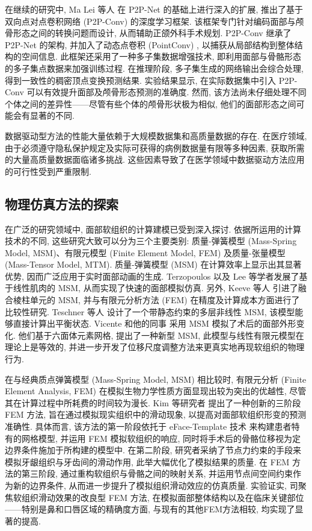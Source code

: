 在继续的研究中, Ma Lei 等人 \cite{maBidirectionalPredictionFacial2023} 在 P2P-Net \cite{yinP2PNETBidirectionalPoint2018} 的基础上进行深入的扩展, 推出了基于双向点对点卷积网络 (P2P-Conv) 的深度学习框架.
该框架专门针对编码面部与颅骨形态之间的转换问题而设计, 从而辅助正颌外科手术规划.
P2P-Conv 继承了 P2P-Net 的架构, 并加入了动态点卷积 (PointConv) , 以捕获从局部结构到整体结构的空间信息.
此框架还采用了一种多子集数据增强技术, 即利用面部与骨骼形态的多子集点数据来加强训练过程.
在推理阶段, 多子集生成的网络输出会综合处理, 得到一致性的稠密顶点变换预测结果.
实验结果显示, 在实际数据集中引入 P2P-Conv 可以有效提升面部及颅骨形态预测的准确度.
然而, 该方法尚未仔细处理不同个体之间的差异性——尽管有些个体的颅骨形状极为相似, 他们的面部形态之间可能会有显著的不同.

数据驱动型方法的性能大量依赖于大规模数据集和高质量数据的存在.
在医疗领域, 由于必须遵守隐私保护规定及实际可获得的病例数据量有限等多种因素, 获取所需的大量高质量数据面临诸多挑战.
这些因素导致了在医学领域中数据驱动方法应用的可行性受到严重限制.

\subsection{物理仿真方法的探索}

在广泛的研究领域中, 面部软组织的计算建模已受到深入探讨.
依据所运用的计算技术的不同, 这些研究大致可以分为三个主要类别: 质量-弹簧模型 (Mass-Spring Model, MSM)、有限元模型 (Finite Element Model, FEM) 及质量-张量模型 (Mass-Tensor Model, MTM).
质量-弹簧模型 (MSM) 在计算效率上显示出其显著优势, 因而广泛应用于实时面部动画的生成.
Terzopoulos \cite{terzopoulosPhysicallyBasedFacial1990} 以及 Lee \cite{leeRealisticModelingFacial1995} 等学者发展了基于线性肌肉的 MSM, 从而实现了快速的面部模拟仿真.
另外, Keeve 等人 \cite{keeveDeformableModelingFacial1998} 引进了融合棱柱单元的 MSM, 并与有限元分析方法 (FEM) 在精度及计算成本方面进行了比较性研究.
Teschner 等人 \cite{teschnerDirectComputationNonlinear} 设计了一个带静态约束的多层非线性 MSM, 该模型能够直接计算出平衡状态.
Vicente 和他的同事 \cite{vicenteMaxillofacialSurgerySimulation2009} 采用 MSM 模拟了术后的面部外形变化.
他们基于六面体元素网格, 提出了一种新型 MSM, 此模型与线性有限元模型在理论上是等效的, 并进一步开发了位移尺度调整方法来更真实地再现软组织的物理行为.

在与经典质点弹簧模型 (Mass-Spring Model, MSM) 相比较时, 有限元分析 (Finite Element Analysis, FEM) 在模拟生物力学性质方面显现出较为突出的优越性, 尽管其在计算过程中所耗费的时间较为漫长.
Kim 等研究者 \cite{kimClinicallyValidatedPrediction2017} 提出了一种创新的三阶段 FEM 方法, 旨在通过模拟现实组织中的滑动现象, 以提高对面部软组织形变的预测准确性.
具体而言, 该方法的第一阶段依托于 eFace-Template 技术 \cite{zhangEFacetemplateMethodEfficiently2016} 来构建患者特有的网格模型, 并运用 FEM 模拟软组织的响应, 同时将手术后的骨骼位移视为定边界条件施加于所构建的模型中.
在第二阶段, 研究者采纳了节点力约束的手段来模拟牙龈组织与牙齿间的滑动作用, 此举大幅优化了模拟结果的质量.
在 FEM 方法的第三阶段, 通过重构软组织与骨骼之间的映射关系, 并运用节点间空间约束作为新的边界条件, 从而进一步提升了模拟组织滑动效应的仿真质量.
实验证实, 司聚焦软组织滑动效果的改良型 FEM 方法, 在模拟面部整体结构以及在临床关键部位——特别是鼻和口唇区域的精确度方面, 与现有的其他FEM方法相较, 均实现了显著的提高.

